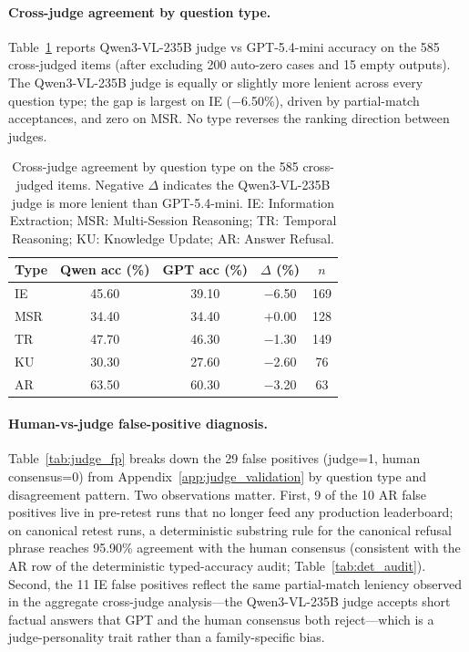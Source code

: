 \documentclass{article}
\begin{document}
\paragraph{Cross-judge agreement by question type.}
Table~\ref{tab:judge_per_type} reports Qwen3-VL-235B judge vs GPT-5.4-mini accuracy on the 585 cross-judged items (after excluding 200 auto-zero cases and 15 empty outputs).
The Qwen3-VL-235B judge is equally or slightly more lenient across every question type; the gap is largest on IE ($-$6.50\%), driven by partial-match acceptances, and zero on MSR.
No type reverses the ranking direction between judges.

\begin{table}[h]
\centering
\small
\caption{Cross-judge agreement by question type on the 585 cross-judged items. Negative $\Delta$ indicates the Qwen3-VL-235B judge is more lenient than GPT-5.4-mini. IE: Information Extraction; MSR: Multi-Session Reasoning; TR: Temporal Reasoning; KU: Knowledge Update; AR: Answer Refusal.}
\label{tab:judge_per_type}
\begin{tabular}{@{}lcccc@{}}
\toprule
\textbf{Type} & \textbf{Qwen acc (\%)} & \textbf{GPT acc (\%)} & \textbf{$\Delta$ (\%)} & \textbf{$n$} \\
\midrule
IE & 45.60 & 39.10 & $-$6.50 & 169 \\
MSR & 34.40 & 34.40 & $+$0.00 & 128 \\
TR & 47.70 & 46.30 & $-$1.30 & 149 \\
KU & 30.30 & 27.60 & $-$2.60 & 76 \\
AR & 63.50 & 60.30 & $-$3.20 & 63 \\
\bottomrule
\end{tabular}
\end{table}

\paragraph{Human-vs-judge false-positive diagnosis.}
Table~\ref{tab:judge_fp} breaks down the 29 false positives (judge=1, human consensus=0) from Appendix~\ref{app:judge_validation} by question type and disagreement pattern.
Two observations matter.
First, 9 of the 10 AR false positives live in pre-retest runs that no longer feed any production leaderboard; on canonical retest runs, a deterministic substring rule for the canonical refusal phrase reaches 95.90\% agreement with the human consensus (consistent with the AR row of the deterministic typed-accuracy audit; Table~\ref{tab:det_audit}).
Second, the 11 IE false positives reflect the same partial-match leniency observed in the aggregate cross-judge analysis---the Qwen3-VL-235B judge accepts short factual answers that GPT and the human consensus both reject---which is a judge-personality trait rather than a family-specific bias.
\end{document}
